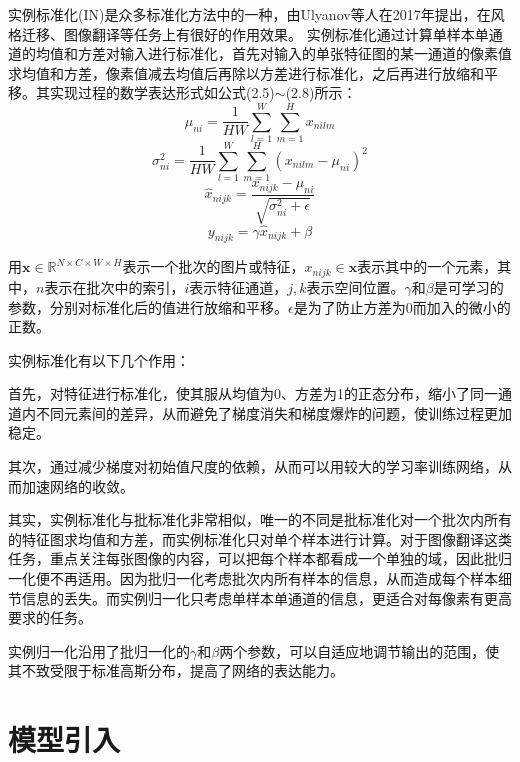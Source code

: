 实例标准化(IN)\cite{instance_norm}是众多标准化方法中的一种，由Ulyanov等人在2017年提出，在风格迁移、图像翻译等任务上有很好的作用效果。
实例标准化通过计算单样本单通道的均值和方差对输入进行标准化，首先对输入的单张特征图的某一通道的像素值求均值和方差，像素值减去均值后再除以方差进行标准化，之后再进行放缩和平移。其实现过程的数学表达形式如公式(2.5)$\sim$(2.8)所示：
\begin{equation}
	\mu_{ni} = \frac{1}{HW} \sum_{l=1}^{W}{\sum_{m=1}^{H}{x_{nilm}}} 
\end{equation}
\begin{equation}
	\sigma_{ni}^{2} = \frac{1}{HW} \sum_{l=1}^{W}{\sum_{m=1}^{H}{(x_{nilm}-\mu_{ni})^2}}
\end{equation}
\begin{equation}
	\hat{x}_{nijk} = \frac{x_{nijk}-\mu_{ni}}{\sqrt{\sigma_{ni}^{2}+\epsilon}}
\end{equation}
\begin{equation}
	y_{nijk} = \gamma \hat{x}_{nijk}+\beta
\end{equation}

用$\symbf{x} \in \mathbb{R}^{N \times C \times W \times H}$表示一个批次的图片或特征，$x_{nijk} \in \symbf{x}$表示其中的一个元素，其中，$n$表示在批次中的索引，$i$表示特征通道，$j,k$表示空间位置。$\gamma$和$\beta$是可学习的参数，分别对标准化后的值进行放缩和平移。$\epsilon$是为了防止方差为0而加入的微小的正数。

实例标准化有以下几个作用：

首先，对特征进行标准化，使其服从均值为0、方差为1的正态分布，缩小了同一通道内不同元素间的差异，从而避免了梯度消失和梯度爆炸的问题，使训练过程更加稳定。

其次，通过减少梯度对初始值尺度的依赖，从而可以用较大的学习率训练网络，从而加速网络的收敛。

其实，实例标准化与批标准化非常相似，唯一的不同是批标准化对一个批次内所有的特征图求均值和方差，而实例标准化只对单个样本进行计算。对于图像翻译这类任务，重点关注每张图像的内容，可以把每个样本都看成一个单独的域，因此批归一化便不再适用。因为批归一化考虑批次内所有样本的信息，从而造成每个样本细节信息的丢失。而实例归一化只考虑单样本单通道的信息，更适合对每像素有更高要求的任务。

实例归一化沿用了批归一化的$\gamma$和$\beta$两个参数，可以自适应地调节输出的范围，使其不致受限于标准高斯分布，提高了网络的表达能力。

\section{模型引入}

